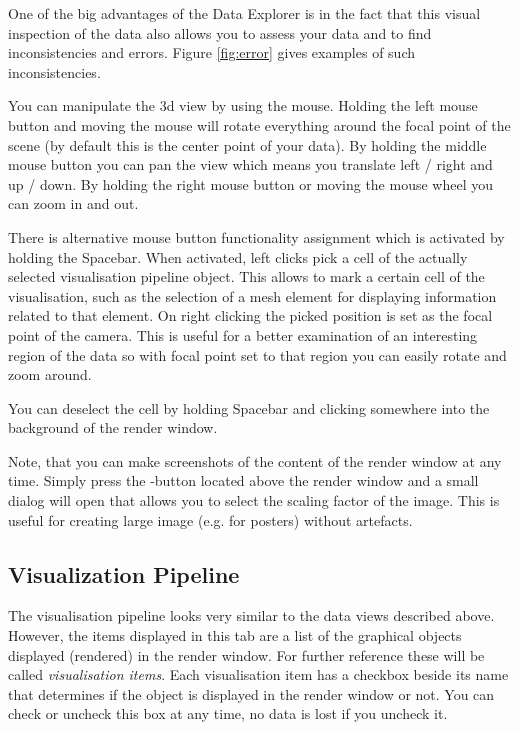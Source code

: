 One of the big advantages of the Data Explorer is in the fact that this visual inspection of the data also allows you to assess your data and to find inconsistencies and errors. Figure \ref{fig:error} gives examples of such inconsistencies.

You can manipulate the 3d view by using the mouse. Holding the left mouse button and moving the mouse will rotate everything around the focal point of the scene (by default this is the center point of your data). By holding the middle mouse button you can pan the view which means you translate left / right and up / down. By holding the right mouse button or moving the mouse wheel you can zoom in and out.

There is alternative mouse button functionality assignment which is activated by holding the Spacebar. When activated, left clicks pick a cell of the actually selected visualisation pipeline object. This allows to mark a certain cell of the visualisation, such as the selection of a mesh element for displaying information related to that element. On right clicking the picked position is set as the focal point of the camera. This is useful for a better examination of an interesting region of the data so with focal point set to that region you can easily rotate and zoom around.

You can deselect the cell by holding Spacebar and clicking somewhere into the background of the render window.

\bigskip

Note, that you can make screenshots of the content of the render window at any time. Simply press the -button located above the render window and a small dialog will open that allows you to select the scaling factor of the image. This is useful for creating large image (e.g. for posters) without artefacts.

\subsection{Visualization Pipeline}

The visualisation pipeline looks very similar to the data views described above. However, the items displayed in this tab are a list of the graphical objects displayed (rendered) in the render window. For further reference these will be called \emph{visualisation items}. Each visualisation item has a checkbox beside its name that determines if the object is displayed in the render window or not. You can check or uncheck this box at any time, no data is lost if you uncheck it.

